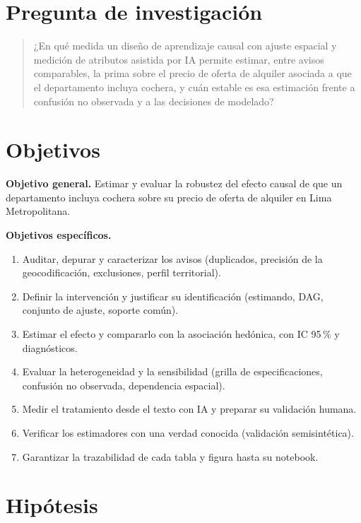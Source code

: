 \section{Pregunta de investigación}\label{sec:pregunta}

\begin{quote}
¿En qué medida un diseño de aprendizaje causal con ajuste espacial y medición de atributos asistida por IA permite estimar, entre avisos comparables, la prima sobre el precio de oferta de alquiler asociada a que el departamento incluya cochera, y cuán estable es esa estimación frente a confusión no observada y a las decisiones de modelado?
\end{quote}

\section{Objetivos}

\textbf{Objetivo general.} Estimar y evaluar la robustez del efecto causal de que un departamento incluya cochera sobre su precio de oferta de alquiler en Lima Metropolitana.

\textbf{Objetivos específicos.}
\begin{enumerate}[label=\textbf{OE\arabic*.}, leftmargin=*, itemsep=0pt]
\item Auditar, depurar y caracterizar los avisos (duplicados, precisión de la geocodificación, exclusiones, perfil territorial).
\item Definir la intervención y justificar su identificación (estimando, DAG, conjunto de ajuste, soporte común).
\item Estimar el efecto y compararlo con la asociación hedónica, con IC 95\,\% y diagnósticos.
\item Evaluar la heterogeneidad y la sensibilidad (grilla de especificaciones, confusión no observada, dependencia espacial).
\item Medir el tratamiento desde el texto con IA y preparar su validación humana.
\item Verificar los estimadores con una verdad conocida (validación semisintética).
\item Garantizar la trazabilidad de cada tabla y figura hasta su notebook.
\end{enumerate}

\section{Hipótesis}\label{sec:hipotesis}

